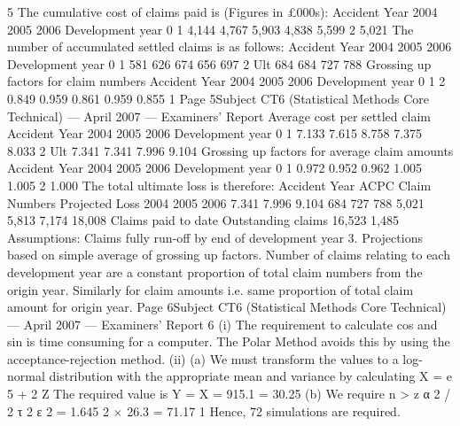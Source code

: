 \documentclass[a4paper,12pt]{article}
\begin{document}
\begin{enumerate}

5
The cumulative cost of claims paid is (Figures in £000s):
Accident Year
2004
2005
2006
Development year
0
1
4,144
4,767
5,903
4,838
5,599
2
5,021
The number of accumulated settled claims is as follows:
Accident Year
2004
2005
2006
Development year
0
1
581
626
674
656
697
2 Ult
684 684
727
788
Grossing up factors for claim numbers
Accident Year
2004
2005
2006
Development year
0
1
2
0.849 0.959
0.861 0.959
0.855
1
Page 5Subject CT6 (Statistical Methods Core Technical) — April 2007 — Examiners’ Report
Average cost per settled claim
Accident Year
2004
2005
2006
Development year
0
1
7.133
7.615
8.758
7.375
8.033
2 Ult
7.341 7.341
7.996
9.104
Grossing up factors for average claim amounts
Accident Year
2004
2005
2006
Development year
0
1
0.972
0.952
0.962
1.005
1.005
2
1.000
The total ultimate loss is therefore:
Accident Year ACPC Claim
Numbers Projected
Loss
2004
2005
2006 7.341
7.996
9.104 684
727
788 5,021
5,813
7,174
18,008
Claims paid to date
Outstanding claims
16,523
1,485
Assumptions:
Claims fully run-off by end of development year 3.
Projections based on simple average of grossing up factors.
Number of claims relating to each development year are a constant proportion of total
claim numbers from the origin year.
Similarly for claim amounts i.e. same proportion of total claim amount for origin year.
Page 6Subject CT6 (Statistical Methods Core Technical) — April 2007 — Examiners’ Report
6
(i) The requirement to calculate cos and sin is time consuming for a computer.
The Polar Method avoids this by using the acceptance-rejection method.
(ii) (a)
We must transform the values to a log-normal distribution with the
appropriate mean and variance by calculating
X = e 5 + 2 Z
The required value is Y = X = 915.1 = 30.25
(b)
We require n >
z α 2 / 2 τ 2
ε 2
=
1.645 2 × 26.3
= 71.17
1
Hence, 72 simulations are required.



\end{enumerate}
\end{document}
